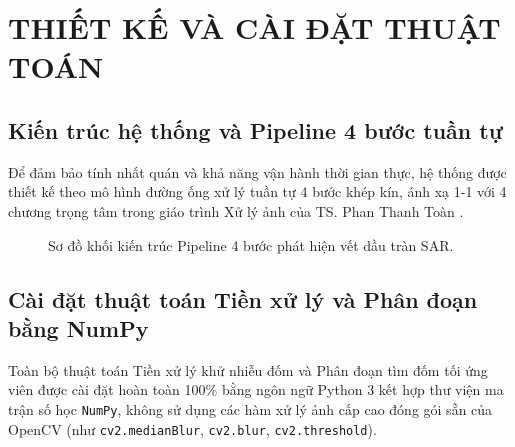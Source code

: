 \chapter{THIẾT KẾ VÀ CÀI ĐẶT THUẬT TOÁN}
\label{ch:methodology}

\section{Kiến trúc hệ thống và Pipeline 4 bước tuần tự}
\label{sec:system_architecture}
Để đảm bảo tính nhất quán và khả năng vận hành thời gian thực, hệ thống được thiết kế theo mô hình đường ống xử lý tuần tự 4 bước khép kín, ánh xạ 1-1 với 4 chương trọng tâm trong giáo trình Xử lý ảnh của TS. Phan Thanh Toàn \cite{toan2024xla}.

\begin{figure}[H]
\centering
{}
\caption{Sơ đồ khối kiến trúc Pipeline 4 bước phát hiện vết dầu tràn SAR.}
\label{fig:pipeline_flowchart}
\end{figure}

\section{Cài đặt thuật toán Tiền xử lý và Phân đoạn bằng NumPy}
\label{sec:algo1_implementation}
Toàn bộ thuật toán Tiền xử lý khử nhiễu đốm và Phân đoạn tìm đốm tối ứng viên được cài đặt hoàn toàn 100\% bằng ngôn ngữ Python 3 kết hợp thư viện ma trận số học \texttt{NumPy}, không sử dụng các hàm xử lý ảnh cấp cao đóng gói sẵn của OpenCV (như \texttt{cv2.medianBlur}, \texttt{cv2.blur}, \texttt{cv2.threshold}).

